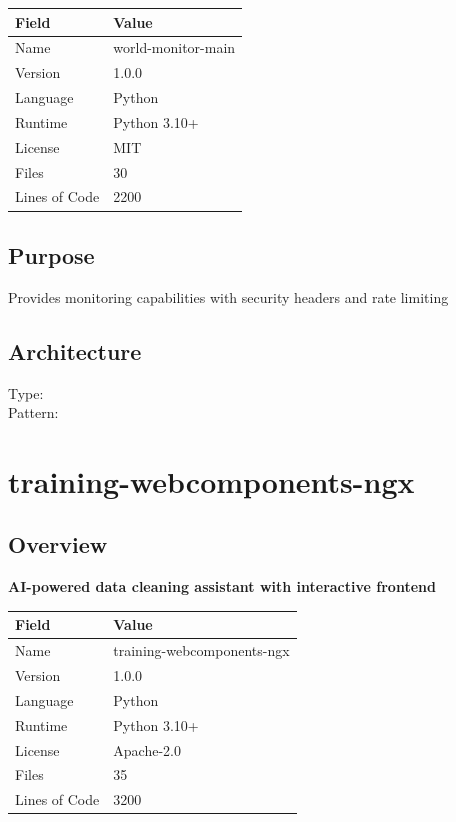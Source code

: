 \documentclass[11pt,a4paper]{article}
\begin{document}
\begin{tabular}{@{}ll@{}}
\toprule
\textbf{Field} & \textbf{Value} \\
\midrule
Name & world-monitor-main \\
Version & 1.0.0 \\
Language & Python \\
Runtime & Python 3.10+ \\
License & MIT \\
Files & 30 \\
Lines of Code & 2200 \\
\bottomrule
\end{tabular}

\subsection{Purpose}
Provides monitoring capabilities with security headers and rate limiting

\subsection{Architecture}
Type:  \\
Pattern: 



\newpage


\section{training-webcomponents-ngx}

\subsection{Overview}

\textbf{AI-powered data cleaning assistant with interactive frontend}

\begin{tabular}{@{}ll@{}}
\toprule
\textbf{Field} & \textbf{Value} \\
\midrule
Name & training-webcomponents-ngx \\
Version & 1.0.0 \\
Language & Python \\
Runtime & Python 3.10+ \\
License & Apache-2.0 \\
Files & 35 \\
Lines of Code & 3200 \\
\bottomrule
\end{tabular}
\end{document}
